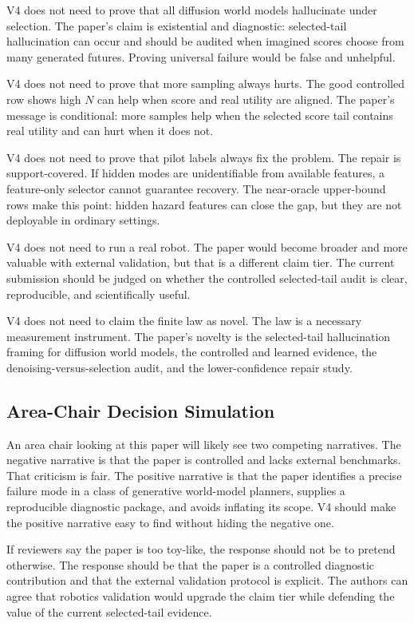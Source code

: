 \documentclass{article}
\begin{document}
V4 does not need to prove that all diffusion world models hallucinate under
selection. The paper's claim is existential and diagnostic: selected-tail
hallucination can occur and should be audited when imagined scores choose from
many generated futures. Proving universal failure would be false and
unhelpful.

V4 does not need to prove that more sampling always hurts. The good controlled
row shows high $N$ can help when score and real utility are aligned. The
paper's message is conditional: more samples help when the selected score tail
contains real utility and can hurt when it does not.

V4 does not need to prove that pilot labels always fix the problem. The repair
is support-covered. If hidden modes are unidentifiable from available
features, a feature-only selector cannot guarantee recovery. The near-oracle
upper-bound rows make this point: hidden hazard features can close the gap, but
they are not deployable in ordinary settings.

V4 does not need to run a real robot. The paper would become broader and more
valuable with external validation, but that is a different claim tier. The
current submission should be judged on whether the controlled selected-tail
audit is clear, reproducible, and scientifically useful.

V4 does not need to claim the finite law as novel. The law is a necessary
measurement instrument. The paper's novelty is the selected-tail hallucination
framing for diffusion world models, the controlled and learned evidence, the
denoising-versus-selection audit, and the lower-confidence repair study.

\subsection{Area-Chair Decision Simulation}
\label{app:v4-ac-simulation}

An area chair looking at this paper will likely see two competing narratives.
The negative narrative is that the paper is controlled and lacks external
benchmarks. That criticism is fair. The positive narrative is that the paper
identifies a precise failure mode in a class of generative world-model
planners, supplies a reproducible diagnostic package, and avoids inflating its
scope. V4 should make the positive narrative easy to find without hiding the
negative one.

If reviewers say the paper is too toy-like, the response should not be to
pretend otherwise. The response should be that the paper is a controlled
diagnostic contribution and that the external validation protocol is explicit.
The authors can agree that robotics validation would upgrade the claim tier
while defending the value of the current selected-tail evidence.
\end{document}
